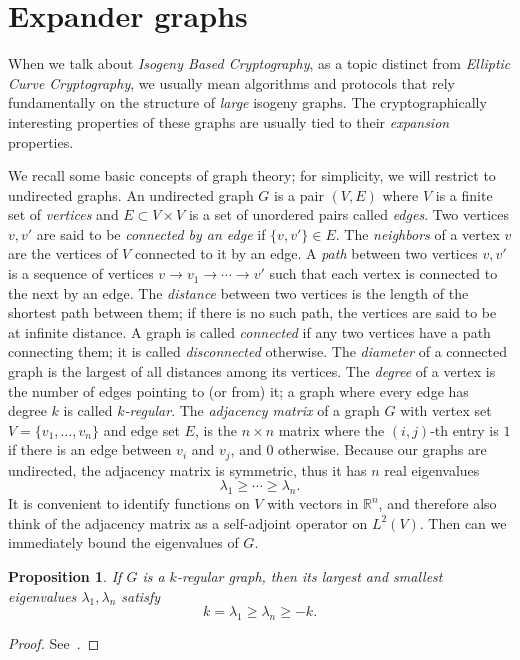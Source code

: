 \documentclass[10pt]{article}
\theoremstyle{plain}
\newtheorem{proposition}[theorem]{Proposition}
\theoremstyle{definition}
\begin{document}
\section{Expander graphs}

When we talk about \emph{Isogeny Based Cryptography}, as a topic
distinct from \emph{Elliptic Curve Cryptography}, we usually mean
algorithms and protocols that rely fundamentally on the structure of
\emph{large} isogeny graphs. %
The cryptographically interesting properties of these graphs are
usually tied to their \emph{expansion} properties. %

We recall some basic concepts of graph theory; for simplicity, we will
restrict to undirected graphs. %
An undirected graph $G$ is a pair $(V,E)$ where $V$ is a finite set of
\emph{vertices} and $E⊂V×V$ is a set of unordered pairs called
\emph{edges}. %
Two vertices $v,v'$ are said to be \emph{connected by an edge} if
$\{v,v'\}∈E$. %
The \emph{neighbors} of a vertex $v$ are the vertices of $V$ connected
to it by an edge. %
A \emph{path} between two vertices $v,v'$ is a sequence of vertices
$v\to v_1\to\cdots\to v'$ such that each vertex is connected to the
next by an edge. %
The \emph{distance} between two vertices is the length of the shortest
path between them; if there is no such path, the vertices are said to
be at infinite distance. %
A graph is called \emph{connected} if any two vertices have a path
connecting them; it is called \emph{disconnected} otherwise. %
The \emph{diameter} of a connected graph is the largest of all
distances among its vertices. %
The \emph{degree} of a vertex is the number of edges pointing to (or
from) it; a graph where every edge has degree $k$ is called
\emph{$k$-regular}. %
The \emph{adjacency matrix} of a graph $G$ with vertex set
$V=\{v_1,\dots,v_n\}$ and edge set $E$, is the $n×n$ matrix where the
$(i,j)$-th entry is $1$ if there is an edge between $v_i$ and $v_j$,
and $0$ otherwise. %
Because our graphs are undirected, the adjacency matrix is symmetric,
thus it has $n$ real eigenvalues
\[λ_1≥\cdots≥λ_n.\] %
It is convenient to identify functions on $V$ with vectors in $ℝ^n$,
and therefore also think of the adjacency matrix as a self-adjoint
operator on $L^2(V)$. %
Then can we immediately bound the eigenvalues of $G$.

\begin{proposition}
  \label{th:graph-eigen}
  If $G$ is a $k$-regular graph, then its largest and smallest
  eigenvalues $λ_1,λ_n$ satisfy
  \[k=λ_1≥λ_n≥-k.\]
\end{proposition}
\begin{proof}
  See~\cite[Lem.~2]{tao2011expander}.
\end{proof}
\end{document}
